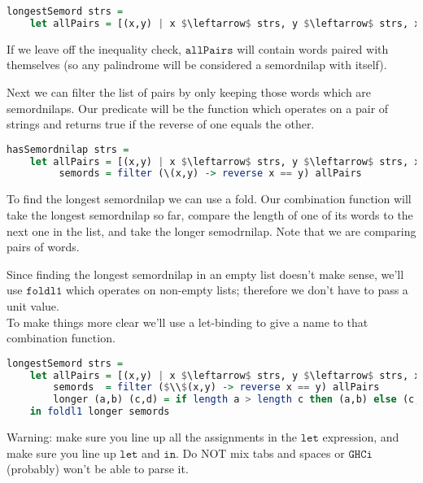 \documentclass[a4paper,12pt]{article}
\newcommand{\kwa}[1]{\mathtt{#1}}
\begin{document}
\begin{lstlisting}[language=Haskell]
longestSemord strs =
	let allPairs = [(x,y) | x $\leftarrow$ strs, y $\leftarrow$ strs, x /= y]
\end{lstlisting}

\noindent
If we leave off the inequality check, $\kwa{allPairs}$ will contain words paired with themselves (so any palindrome will be considered a semordnilap with itself).

\noindent
Next we can filter the list of pairs by only keeping those words which are semordnilaps. Our predicate will be the function which operates on a pair of strings and returns true if the reverse of one equals the other.

\begin{lstlisting}[language=Haskell]
hasSemordnilap strs =
	let allPairs = [(x,y) | x $\leftarrow$ strs, y $\leftarrow$ strs, x /= y]
	     semords = filter (\(x,y) -> reverse x == y) allPairs
\end{lstlisting}

\noindent
To find the longest semordnilap we can use a fold. Our combination function will take the longest semordnilap so far, compare the length of one of its words to the next one in the list, and take the longer semodrnilap. Note that we are comparing pairs of words.

\noindent
Since finding the longest semordnilap in an empty list doesn't make sense, we'll use $\kwa{foldl1}$ which operates on non-empty lists; therefore we don't have to pass a unit value. \\

\noindent
To make things more clear we'll use a let-binding to give a name to that combination function.

\begin{lstlisting}[language=Haskell]
longestSemord strs =
	let allPairs = [(x,y) | x $\leftarrow$ strs, y $\leftarrow$ strs, x /= y]
        semords  = filter ($\\$(x,y) -> reverse x == y) allPairs
        longer (a,b) (c,d) = if length a > length c then (a,b) else (c,d)
    in foldl1 longer semords
\end{lstlisting}

\noindent
Warning: make sure you line up all the assignments in the $\kwa{let}$ expression, and make sure you line up $\kwa{let}$ and $\kwa{in}$. Do NOT mix tabs and spaces or $\kwa{GHCi}$ (probably) won't be able to parse it. \\
\end{document}
